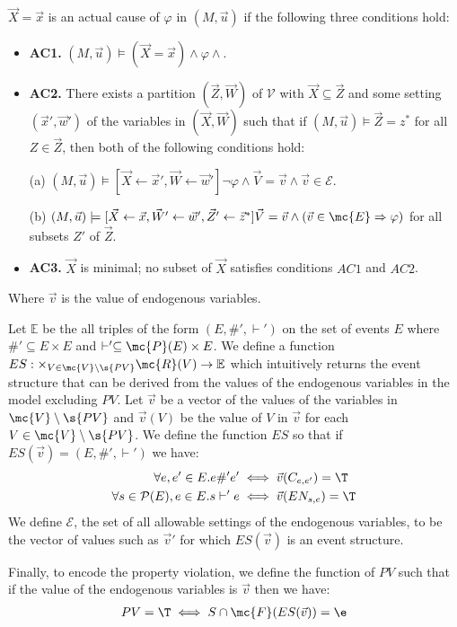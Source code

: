 \begin{definition}
    $\vec X = \vec x$ is an actual cause of $\varphi$ in $(M,\vec u)$ if the following three conditions hold:
    \begin{itemize}
        \item  \textbf{AC1.} $(M,\vec u)\models (\vec X = \vec x) \wedge \varphi \wedge $.
        \item  \textbf{AC2. }There exists a partition $(\vec Z, \vec W)$ of $\mathcal{V}$ with $\vec X \subseteq \vec Z$ and some setting $(\vec x',\vec w')$ of the variables in $(\vec X,\vec W)$ such that if $(M,\vec u)\models \vec Z = z^*$ for all $Z\in \vec Z$, then both of the following conditions hold:

              (a) $(M,\vec u)\models[\vec X \leftarrow \vec x', \vec W \leftarrow \vec w']\neg \varphi
                  \wedge \vec V = \vec v
                  \wedge  \vec v \in \mathcal{E}$.

              (b) $(M,\vec u)\models[\vec X\leftarrow \vec x, \vec W'
                      \leftarrow \vec w', \vec Z'\leftarrow \vec z^*]
                  \vec V = \vec v \wedge (\vec v \in \mc{E} \Rightarrow \varphi)$
              for all subsets $Z'$ of $\vec Z$.

        \item  \textbf{AC3.} $\vec X$ is minimal; no subset of $\vec X$ satisfies conditions $AC1$ and $AC2$.
    \end{itemize}
    Where $\vec v$ is the value of endogenous variables.
\end{definition}

Let $\mathbb{E}$ be the all triples of the form
$(E,\#',\vdash')$ on the set of events $E$ where
$\#' \subseteq E \times E$ and
$\vdash' \subseteq \mc{P}(E) \times E$.
We define a function
$ES: \times_{V \in \mc{V}\setminus \s{PV}} \mc{R}(V) \rightarrow \mathbb{E}$ which intuitively returns the event structure
that can be derived from the values of the endogenous variables
in the model excluding $PV$.
Let $\vec v$ be a vector of the values of the variables
in $\mc{V} \setminus \s{PV}$ and $\vec v(V)$ be the value of
$V$ in $\vec v$ for each $V \in \mc{V} \setminus \s{PV}$.
We define the function $ES$ so that if
$ES(\vec v) = (E,\#',\vdash')$ we have:
\begin{align*}
    \forall e,e' \in E. e \#' e' & \iff \vec{v}(C_{e,e'}) = \T \\
    \forall s \in \mathcal{P}(E), e \in E.  s \vdash' e
                                 & \iff \vec{v}(EN_{s,e}) = \T
\end{align*}
We define $\mathcal{E}$, the set of all allowable
settings of the endogenous variables, to be the vector of
values such as $\vec v'$ for which $ES(\vec v)$ is an
event structure.

Finally, to encode the property violation,
we define the function of $PV$ such that
if the value of the endogenous variables is
$\vec v$ then we have:
\begin{align*}
    PV = \T \iff S \cap \mc{F}(ES(\vec v)) = \e
\end{align*}